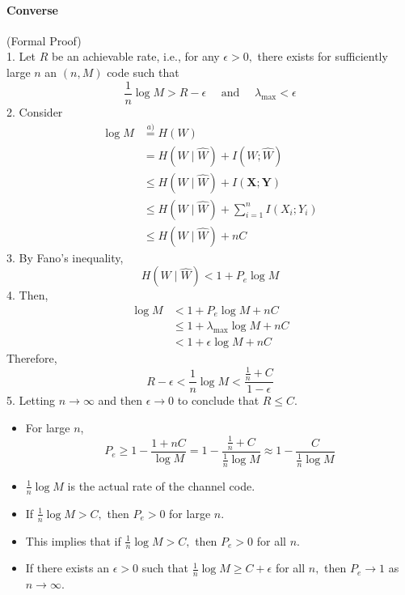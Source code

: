 \documentclass[8pt]{article}
\begin{document}
\paragraph{Converse} (Formal Proof) \\
1. Let $R$ be an achievable rate, i.e., for any $\epsilon>0,$ there exists for sufficiently large $n$ an $(n, M)$ code such that
$$
\frac{1}{n} \log M>R-\epsilon \quad \text { and } \quad \lambda_{\max }<\epsilon
$$
2. Consider
$$
\begin{aligned}
\log M & \stackrel{a)}{=} H(W) \\
&=H(W \mid \hat{W})+I(W ; \hat{W}) \\
& \leq H(W \mid \hat{W})+I(\mathbf{X} ; \mathbf{Y}) \\
& \leq H(W \mid \hat{W})+\sum_{i=1}^{n} I\left(X_{i} ; Y_{i}\right) \\
& \leq H(W \mid \hat{W})+n C
\end{aligned}
$$
3. By Fano's inequality,
$$
H(W \mid \hat{W})<1+P_{e} \log M
$$
4. Then,
$$
\begin{aligned}
\log M &<1+P_{e} \log M+n C \\
& \leq 1+\lambda_{\max } \log M+n C \\
&<1+\epsilon \log M+n C
\end{aligned}
$$
Therefore,
$$
R-\epsilon<\frac{1}{n} \log M<\frac{\frac{1}{n}+C}{1-\epsilon}
$$
5. Letting $n \rightarrow \infty$ and then $\epsilon \rightarrow 0$ to conclude that $R \leq C$.

\begin{itemize}
	\item For large $n$,
	$$
	P_{e} \geq 1-\frac{1+n C}{\log M}=1-\frac{\frac{1}{n}+C}{\frac{1}{n} \log M} \approx 1-\frac{C}{\frac{1}{n} \log M}
	$$
	\item $\frac{1}{n} \log M$ is the actual rate of the channel code.
	\item If $\frac{1}{n} \log M>C,$ then $P_{e}>0$ for large $n$.
	\item This implies that if $\frac{1}{n} \log M>C,$ then $P_{e}>0$ for all $n$.
	\item If there exists an $\epsilon>0$ such that $\frac{1}{n} \log M \geq C+\epsilon$ for all $n,$ then $P_{e} \rightarrow 1$ as $n \rightarrow \infty$.
\end{itemize}
\end{document}
